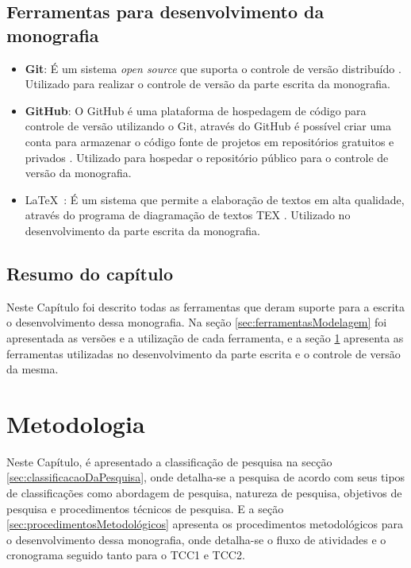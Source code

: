 \section{Ferramentas para desenvolvimento da monografia}
\label{sec:ferramentasDesenvolvimento}

\begin{itemize}
	\item \textbf{Git}: É um sistema \textit{open source} que suporta o controle de versão distribuído \cite{git}. Utilizado para realizar o controle de versão da parte escrita da monografia. 
	\item \textbf{GitHub}: O GitHub é uma plataforma de hospedagem de código para controle de versão utilizando o Git, através do GitHub é possível criar uma conta para armazenar o código fonte de projetos em repositórios gratuitos e privados \cite{github}. Utilizado para hospedar o repositório público para o controle de versão da monografia. 
	\item \LaTeX\ : É um sistema que permite a elaboração de textos em alta qualidade, através do programa de diagramação de textos TEX \cite{latex}. Utilizado no desenvolvimento da parte escrita da monografia. 
\end{itemize}

\section{Resumo do capítulo}

Neste Capítulo foi descrito todas as ferramentas que deram suporte para a escrita o desenvolvimento dessa monografia. Na seção \ref{sec:ferramentasModelagem} foi apresentada as versões e a utilização de cada ferramenta, e a seção \ref{sec:ferramentasDesenvolvimento} apresenta as ferramentas utilizadas no desenvolvimento da parte escrita e o controle de versão da mesma. 

\chapter{Metodologia}
\label{chap:metodologia}

Neste Capítulo, é apresentado a classificação de pesquisa na secção \ref{sec:classificacaoDaPesquisa}, onde detalha-se a pesquisa de acordo com seus tipos de classificações como abordagem de pesquisa, natureza de pesquisa, objetivos de pesquisa e procedimentos técnicos de pesquisa. E a seção \ref{sec:procedimentosMetodológicos} apresenta os procedimentos metodológicos para o desenvolvimento dessa monografia, onde detalha-se o fluxo de atividades e o cronograma seguido tanto para o TCC1 e TCC2.  

